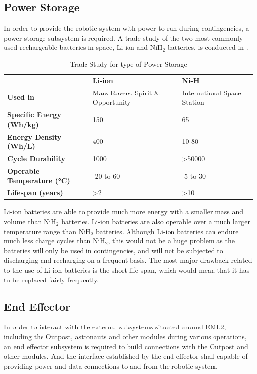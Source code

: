 \documentclass[12pt, letterpaper]{article}
\begin{document}
\subsection{Power Storage}
\label{sect:powerto}
In order to provide the robotic system with power to run during contingencies, a power storage subsystem is required. A trade study of the two most commonly used rechargeable batteries in space, Li-ion and NiH$_2$ batteries,
 is conducted in .
\begin{table}[H]
\centering
\caption{Trade Study for type of Power Storage}
\begin{tabular}{|P{6cm}|P{4.2cm}|P{4.2cm}|}
\hline
	&	\textbf{Li-ion}	&	\textbf{Ni-H}	\\\hhline{|=|=|=|}
\textbf{Used in}	&
Mars Rovers: Spirit \& Opportunity \cite{Liion_Mars}	&
International Space Station \cite{ISS_power}	\\\hline
\textbf{Specific Energy (Wh/kg)}	&
150 \cite{batt_primer}	&	65 \cite{NiH_se}	\\\hline
\textbf{Energy Density (Wh/L)}	&
400 \cite{batt_primer}	&	10-80 \cite{NASA_energy}	\\\hline
\textbf{Cycle Durability}	&
1000 \cite{batt_primer}	&	\textgreater50000 \cite{NASA_energy}	\\\hline
\textbf{Operable Temperature (\si{\degreeCelsius})}	&
-20 to 60 \cite{batt_primer}	&	-5 to 30 \cite{NASA_energy}	\\\hline
\textbf{Lifespan (years)}	&
\textgreater2 \cite{NASA_energy}	&	\textgreater10 \cite{NASA_energy}	\\\hline
\end{tabular}
\label{table:powerto}
\end{table}
Li-ion batteries are able to provide much more energy with a smaller mass and volume than NiH$_2$ batteries. Li-ion batteries are also operable over a much larger temperature range than NiH$_2$ batteries. Although Li-ion batteries can endure much less charge cycles than NiH$_2$, this would not be a huge problem as the batteries will only be used in contingencies, and will not be subjected to discharging and recharging on a frequent basis. The most major drawback related to the use of Li-ion batteries is the short life span, which would mean that it has to be replaced fairly frequently.

\subsection{End Effector}
\label{sect:endeffectorto}
In order to interact with the external subsystems situated around EML2, including the Outpost, astronauts and other modules during various operations, an end effector subsystem is required to build connections with the Outpost and other modules. And the interface established by the end effector shall capable of providing power and data connections to and from the robotic system.
\end{document}
